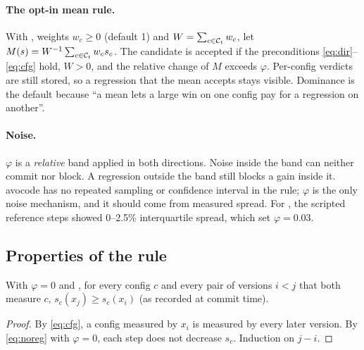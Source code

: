 \paragraph{The opt-in mean rule.} With , weights $w_c \geq 0$ (default 1) and
$W = \sum_{c \in \mathcal{C}_t} w_c$, let $M(s) = W^{-1}\sum_{c\in\mathcal{C}_t} w_c s_c$. The candidate is
accepted if the preconditions \eqref{eq:dir}--\eqref{eq:cfg} hold, $W > 0$, and the relative change
of $M$ exceeds $\varphi$. Per-config verdicts are still stored, so a regression that the mean accepts
stays visible. Dominance is the default because ``a mean lets a large win on one config pay for a
regression on another''.

\paragraph{Noise.} $\varphi$ is a \emph{relative} band applied in both directions. Noise inside the
band can neither commit nor block. A regression outside the band still blocks a gain inside it.
avocode has no repeated sampling or confidence interval in the rule; $\varphi$ is the only noise
mechanism, and it should come from measured spread. For , the scripted reference
steps showed 0--2.5\% interquartile spread, which set $\varphi = 0.03$.

\subsection{Properties of the rule}

\begin{proposition}
\label{prop:monotone}
With $\varphi = 0$ and , for every config $c$ and every pair of versions
$i < j$ that both measure $c$, $s_c(x_j) \geq s_c(x_i)$ (as recorded at commit time).
\end{proposition}
\begin{proof}
By \eqref{eq:cfg}, a config measured by $x_i$ is measured by every later version. By
\eqref{eq:noreg} with $\varphi = 0$, each step does not decrease $s_c$. Induction on $j - i$.
\end{proof}

